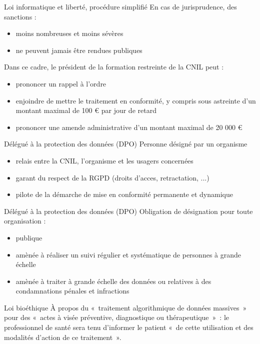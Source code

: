 \begin{frame}{Loi informatique et liberté, procédure simplifié}
  En cas de jurisprudence, des sanctions :
  \begin{itemize}
    \item moins nombreuses et moins sévères
    \item ne peuvent jamais être rendues publiques
  \end{itemize}
  Dans ce cadre, le président de la formation restreinte de la CNIL peut :
  \begin{itemize}
      \item prononcer un rappel à l’ordre 
      \item enjoindre de mettre le traitement en conformité, 
            y compris sous astreinte d’un montant maximal de 100 € par jour de retard 
      \item prononcer une amende administrative d’un montant maximal de 20 000 €
  \end{itemize}
\end{frame}

\begin{frame}{Délégué à la protection des données (DPO)}
  Personne désigné par un organisme
  \begin{itemize}
    \item relais entre la CNIL, l’organisme et les usagers concernées
    \item garant du respect de la RGPD (droits d’acces, retractation, ...)
    \item pilote de la démarche de mise en conformité permanente et dynamique
  \end{itemize}
\end{frame}

\begin{frame}{Délégué à la protection des données (DPO)}
  Obligation de désignation pour toute organisation :
  \begin{itemize}
    \item publique
    \item amènée à réaliser un suivi régulier et systématique de personnes à grande échelle
    \item amènée à traiter à grande échelle des données 
          ou relatives à des condamnations pénales et infractions
  \end{itemize}
\end{frame}

\begin{frame}{Loi bioéthique}
  À propos du «~traitement algorithmique de données massives~» pour des 
  «~actes à visée préventive, diagnostique ou thérapeutique~»~: 
  le professionnel de santé sera tenu d’informer le patient 
  «~de cette utilisation et des modalités d’action de ce traitement~».
\end{frame}
